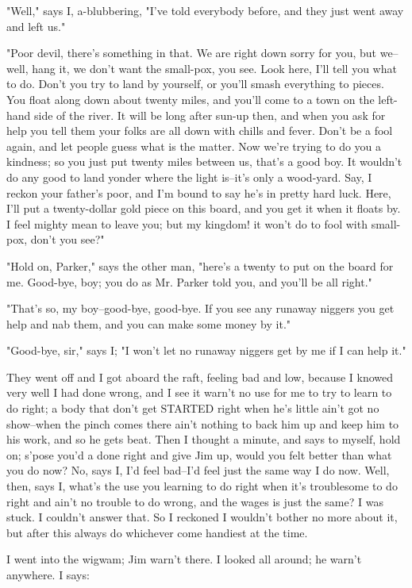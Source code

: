 "Well," says I, a-blubbering, "I've told everybody before, and they just
went away and left us."

"Poor devil, there's something in that.  We are right down sorry for you,
but we--well, hang it, we don't want the small-pox, you see.  Look here,
I'll tell you what to do.  Don't you try to land by yourself, or you'll
smash everything to pieces.  You float along down about twenty miles, and
you'll come to a town on the left-hand side of the river.  It will be
long after sun-up then, and when you ask for help you tell them your
folks are all down with chills and fever.  Don't be a fool again, and let
people guess what is the matter.  Now we're trying to do you a kindness;
so you just put twenty miles between us, that's a good boy.  It wouldn't
do any good to land yonder where the light is--it's only a wood-yard.
Say, I reckon your father's poor, and I'm bound to say he's in pretty
hard luck.  Here, I'll put a twenty-dollar gold piece on this board, and
you get it when it floats by.  I feel mighty mean to leave you; but my
kingdom! it won't do to fool with small-pox, don't you see?"

"Hold on, Parker," says the other man, "here's a twenty to put on the
board for me.  Good-bye, boy; you do as Mr. Parker told you, and you'll
be all right."

"That's so, my boy--good-bye, good-bye.  If you see any runaway niggers
you get help and nab them, and you can make some money by it."

"Good-bye, sir," says I; "I won't let no runaway niggers get by me if I
can help it."

They went off and I got aboard the raft, feeling bad and low, because I
knowed very well I had done wrong, and I see it warn't no use for me to
try to learn to do right; a body that don't get STARTED right when he's
little ain't got no show--when the pinch comes there ain't nothing to
back him up and keep him to his work, and so he gets beat.  Then I
thought a minute, and says to myself, hold on; s'pose you'd a done right
and give Jim up, would you felt better than what you do now?  No, says I,
I'd feel bad--I'd feel just the same way I do now.  Well, then, says I,
what's the use you learning to do right when it's troublesome to do right
and ain't no trouble to do wrong, and the wages is just the same?  I was
stuck.  I couldn't answer that.  So I reckoned I wouldn't bother no more
about it, but after this always do whichever come handiest at the time.

I went into the wigwam; Jim warn't there.  I looked all around; he warn't
anywhere.  I says:

